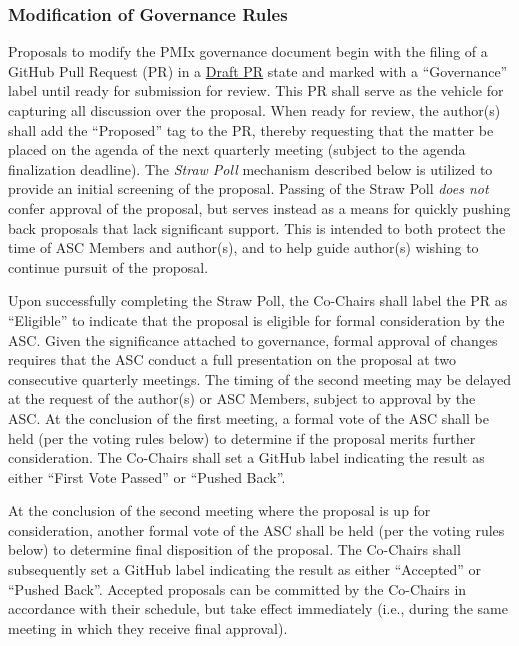 \documentclass{article}
\begin{document}
\hypertarget{modification-of-governance-rules}{%
\subsubsection{Modification of Governance Rules}%
\label{modification-of-governance-rules}}

Proposals to modify the PMIx governance document begin with the filing
of a GitHub Pull Request (PR) in a
\href{https://github.blog/2019-02-14-introducing-draft-pull-requests/}{Draft
PR} state and marked with a ``Governance'' label until ready for
submission for review. This PR shall serve as the vehicle for capturing
all discussion over the proposal. When ready for review, the author(s)
shall add the ``Proposed'' tag to the PR, thereby requesting that the
matter be placed on the agenda of the next quarterly meeting (subject to
the agenda finalization deadline). The \textit{Straw Poll} mechanism described
below is utilized to provide an initial screening of the proposal.
Passing of the Straw Poll \emph{does not} confer approval of the
proposal, but serves instead as a means for quickly pushing back
proposals that lack significant support. This is intended to both
protect the time of ASC Members and author(s), and to help guide
author(s) wishing to continue pursuit of the proposal.

Upon successfully completing the Straw Poll, the Co-Chairs shall label
the PR as ``Eligible'' to indicate that the proposal is
eligible for formal consideration by the ASC. Given the significance
attached to governance, formal approval of changes requires that the ASC
conduct a full presentation on the proposal at two consecutive quarterly
meetings. The timing of the second meeting may be delayed at the request
of the author(s) or ASC Members, subject to approval by the ASC. At the
conclusion of the first meeting, a formal vote of the ASC shall be held
(per the voting rules below) to determine if the proposal merits further
consideration. The Co-Chairs shall set a GitHub label indicating the
result as either ``First Vote Passed'' or ``Pushed
Back''.

At the conclusion of the second meeting where the proposal is up for
consideration, another formal vote of the ASC shall be held (per the
voting rules below) to determine final disposition of the proposal. The
Co-Chairs shall subsequently set a GitHub label indicating the result as
either ``Accepted'' or ``Pushed Back''. Accepted
proposals can be committed by the Co-Chairs in accordance with their
schedule, but take effect immediately (i.e., during the same meeting in
which they receive final approval).
\end{document}
